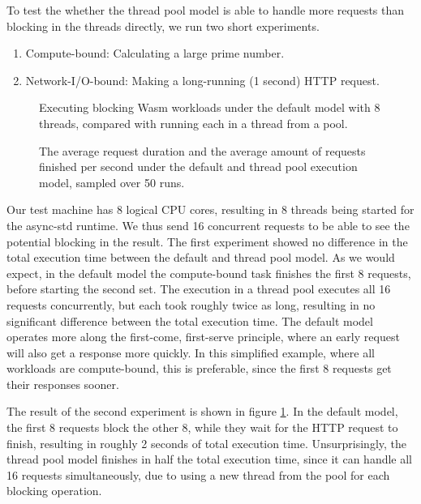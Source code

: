 To test the whether the thread pool model is able to handle more requests than blocking in the threads directly, we run two short experiments.

\begin{enumerate}
    \item Compute-bound: Calculating a large prime number.
    \item Network-I/O-bound: Making a long-running (1 second) HTTP request.
\end{enumerate}

\begin{figure}
    \begin{center}
        
    \end{center}
    \caption{Executing blocking Wasm workloads under the  default model with 8 threads, compared with running each in a thread from a pool.}
    \label{fig:default_vs_thread_pool}
\end{figure}

\begin{figure}
    \begin{center}
        
    \end{center}
    \caption{The average request duration and the average amount of requests finished per second under the default and thread pool execution model, sampled over 50 runs.}
    \label{fig:default_vs_thread_pool_mixed}
\end{figure}

Our test machine has 8 logical CPU cores, resulting in 8 threads being started for the async-std runtime. We thus send 16 concurrent requests to be able to see the potential blocking in the result. The first experiment showed no difference in the total execution time between the default and thread pool model. As we would expect, in the default model the compute-bound task finishes the first 8 requests, before starting the second set. The execution in a thread pool executes all 16 requests concurrently, but each took roughly twice as long, resulting in no significant difference between the total execution time. The default model operates more along the first-come, first-serve principle, where an early request will also get a response more quickly. In this simplified example, where all workloads are compute-bound, this is preferable, since the first 8 requests get their responses sooner.

The result of the second experiment is shown in figure \ref{fig:default_vs_thread_pool}. In the default model, the first 8 requests block the other 8, while they wait for the HTTP request to finish, resulting in roughly 2 seconds of total execution time. Unsurprisingly, the thread pool model finishes in half the total execution time, since it can handle all 16 requests simultaneously, due to using a new thread from the pool for each blocking operation.


